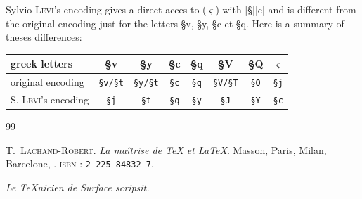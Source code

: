 \documentclass[full, english]{l3doc}
\begin{document}
Sylvio \textsc{Levi}'s encoding gives a direct acces to 
(\(\varsigma\)) with |§||c| and is different from the original encoding
just for the letters {\ActiveLaParesse §v, §y, §c et §q}. Here is a
summary of theses differences:

\begin{center}
\newcommand\CT[1]{\multicolumn{1}{c|}{\texttt{#1}}}
\begin{ParesseActive}
\begin{tabular}{|l|*{7}{c|}}\hline
greek letters
& §v & §y & §c & §q & §V & §Q & \(\varsigma\)\\\hline
original encoding
&\CT{\S{}v/\S{}t}&\CT{\S{}y/\S{}t}&\CT{\S{}c}
&\CT{\S{}q}&\CT{\S{}V/\S{}T}&\CT{\S{}Q}& \CT{\S{}j} \\\hline
S. \textsc{Levi}'s encoding
&\CT{\S{}j}&\CT{\S{}t}&\CT{\S{}q}&\CT{\S{}y}
&\CT{\S{}J}&\CT{\S{}Y} & \CT{\S{}c}\\\hline
\end{tabular}
\end{ParesseActive}
\end{center}


\begin{thebibliography}{99}
 T.~\textsc{Lachand-Robert}.
\emph{La maîtrise de \TeX{} et \LaTeX{}}.
Masson, Paris, Milan, Barcelone, .
\textsc{isbn} : \texttt{2-225-84832-7}.
\end{thebibliography}


\noindent\hspace*{0.2\textwidth}\hrulefill\hspace*{0.2\textwidth}
\begin{center}
  \textsl{Le TeXnicien de Surface scripsit.}
\end{center}
\noindent\hspace*{0.2\textwidth}\hrulefill\hspace*{0.2\textwidth}

\end{document}
